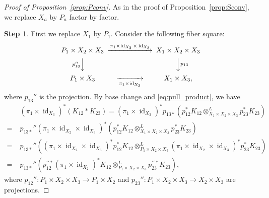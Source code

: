 \documentclass[12pt]{amsart}
\theoremstyle{definition}
\theoremstyle{remark}
\numberwithin{equation}{subsection}
\newcommand{\propref}[1]{Proposition~\ref{#1}}
\newcommand{\id}{\operatorname{id}}
\begin{document}
\begin{proof}[Proof of \propref{prop:Pconv}]
As in the proof of \propref{prop:Sconv}, we replace $X_a$ by $P_a$
factor by factor.

{\bf Step 1}. First we replace $X_1$ by $P_1$. Consider the following
fiber square:
\begin{equation*}
\begin{CD}
  P_1\times X_2\times X_3 @>{\pi_1\times\id_{X_2}\times\id_{X_3}}>>
  X_1\times X_2\times X_3 \\
  @V{p_{13}''}VV @VV{p_{13}}V \\
  P_1\times X_3 @>>{\pi_1\times\id_{X_3}}> X_1\times X_3,
\end{CD}
\end{equation*}
where $p_{13}''$ is the projection. By base change
\cite[5.3.15]{Gi-book} and \eqref{eq:pull_product}, we have
\begin{equation}\label{eq:Pconv1}
\begin{split}
  & (\pi_1\times\id_{X_3})^* (K_{12} * K_{23})
   = (\pi_1\times\id_{X_3})^* p_{13*}
\left( p_{12}^* K_{12}\otimes^L_{X_1\times X_2\times X_3} p_{23}^*
  K_{23}\right) \\
 = \; & p_{13*}'' (\pi_1\times\id_{X_2}\times\id_{X_3})^*
 \left( p_{12}^* K_{12}\otimes^L_{X_1\times X_2\times X_3} p_{23}^*
  K_{23}\right) \\
 =\; & p_{13*}'' \left( 
   (\pi_1\times\id_{X_2}\times\id_{X_3})^* p_{12}^* K_{12}
      \otimes^L_{P_1\times X_2\times X_3}
   (\pi_1\times\id_{X_2}\times\id_{X_3})^* p_{23}^* K_{23} \right) \\
 =\; & p_{13*}'' \left( 
   p_{12}^{\prime\prime*}(\pi_1\times\id_{X_2})^* K_{12}
      \otimes^L_{P_1\times X_2\times X_3}
   p_{23}^{\prime\prime*} K_{23} \right),
\end{split}
\end{equation}
where $p_{12}''\colon P_1\times X_2\times X_3\to P_1\times X_2$ and
$p_{23}''\colon P_1\times X_2\times X_3\to X_2\times X_3$ are
projections.


\end{proof}
\end{document}
